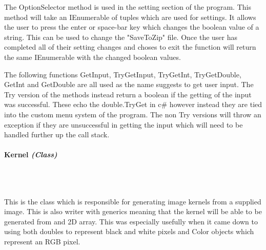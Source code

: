 \begin{FlushLeft}
    The OptionSelector method is used in the setting section of the program. This method will take an IEnumerable of tuples which are used for settings. It allows the user to press the enter or space-bar key which changes the boolean value of a string. This can be used to change the "SaveToZip" file. Once the user has completed all of their setting changes and choses to exit the function will return the same IEnumerable with the changed boolean values. \\ \bk

    The following functions GetInput, TryGetInput, TryGetInt, TryGetDouble, GetInt and GetDouble are all used as the name suggests to get user input. The Try version of the methods instead return a boolean if the getting of the input was successful. These echo the double.TryGet in c# however instead they are tied into the custom menu system of the program. The non Try versions will throw an exception if they are unsuccessful in getting the input which will need to be handled further up the call stack.\\ 

    \bk

    
    \paragraph{Kernel \textit{(Class)}} \mbox{} \\

    \begin{figure}[H]
        \centering
    \end{figure}\\

    This is the class which is responsible for generating image kernels from a supplied image. This is also writer with generics meaning that the kernel will be able to be generated from and 2D array. This was especially usefully when it came down to using both doubles to represent black and white pixels and Color objects which represent an RGB pixel. \\ \bk


\end{FlushLeft}
